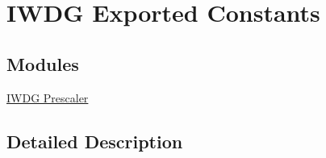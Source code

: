 \hypertarget{group___i_w_d_g___exported___constants}{\section{I\-W\-D\-G Exported Constants}
\label{group___i_w_d_g___exported___constants}
}
\subsection*{Modules}
\begin{DoxyCompactItemize}
\item 
\hyperlink{group___i_w_d_g___prescaler}{I\-W\-D\-G Prescaler}
\end{DoxyCompactItemize}


\subsection{Detailed Description}
